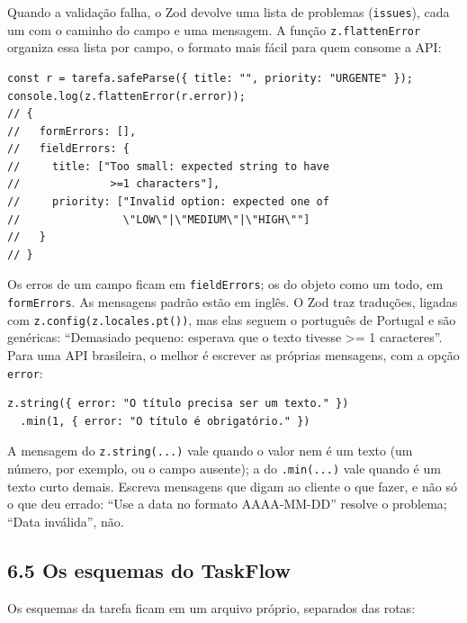 Quando a validação falha, o Zod devolve uma lista de problemas (\texttt{issues}), cada um com o caminho do campo e uma mensagem. A função \texttt{z.flattenError} organiza essa lista por campo, o formato mais fácil para quem consome a API:

\begin{codigo}
\begin{Verbatim}[breaklines=true, breaksymbolleft={}, fontsize=\footnotesize]
const r = tarefa.safeParse({ title: "", priority: "URGENTE" });
console.log(z.flattenError(r.error));
// {
//   formErrors: [],
//   fieldErrors: {
//     title: ["Too small: expected string to have
//              >=1 characters"],
//     priority: ["Invalid option: expected one of
//                \"LOW\"|\"MEDIUM\"|\"HIGH\""]
//   }
// }
\end{Verbatim}
\end{codigo}

Os erros de um campo ficam em \texttt{fieldErrors}; os do objeto como um todo, em \texttt{formErrors}. As mensagens padrão estão em inglês. O Zod traz traduções, ligadas com \texttt{z.config(z.locales.pt())}, mas elas seguem o português de Portugal e são genéricas: ``Demasiado pequeno: esperava que o texto tivesse >= 1 caracteres''. Para uma API brasileira, o melhor é escrever as próprias mensagens, com a opção \texttt{error}:

\begin{codigo}
\begin{Verbatim}[breaklines=true, breaksymbolleft={}, fontsize=\footnotesize]
z.string({ error: "O título precisa ser um texto." })
  .min(1, { error: "O título é obrigatório." })
\end{Verbatim}
\end{codigo}

A mensagem do \texttt{z.string(...)} vale quando o valor nem é um texto (um número, por exemplo, ou o campo ausente); a do \texttt{.min(...)} vale quando é um texto curto demais. Escreva mensagens que digam ao cliente o que fazer, e não só o que deu errado: ``Use a data no formato AAAA-MM-DD'' resolve o problema; ``Data inválida'', não.

\subsection{6.5 Os esquemas do TaskFlow}

Os esquemas da tarefa ficam em um arquivo próprio, separados das rotas:

